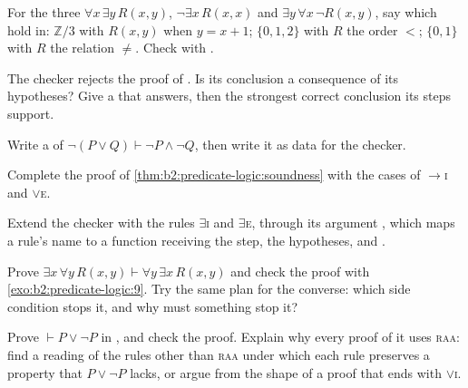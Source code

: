 \begin{exercise}[$\star\star$]\label{exo:b2:predicate-logic:5}
For the three  $\forall x\, \exists y\, R(x, y)$, $\neg \exists x\, R(x, x)$ and $\exists y\, \forall x\, \neg
R(x, y)$, say which hold in: $\mathbb{Z}/3$ with $R(x, y)$ when $y = x + 1$; $\{0, 1, 2\}$ with $R$ the order $<$;
$\{0, 1\}$ with $R$ the relation $\neq$. Check with .
\end{exercise}

\begin{exercise}[$\star\star$]\label{exo:b2:predicate-logic:6}
The checker rejects the proof of . Is its conclusion a consequence of its hypotheses? Give a
 that answers, then the strongest correct conclusion its steps support.
\end{exercise}

\begin{exercise}[$\star\star$]\label{exo:b2:predicate-logic:7}
Write a  of $\neg(P \vee Q) \vdash \neg P \wedge \neg Q$, then write it as data for the checker.
\end{exercise}

\begin{exercise}[$\star\star$]\label{exo:b2:predicate-logic:8}
Complete the proof of \cref{thm:b2:predicate-logic:soundness} with the cases of $\to$\textsc{i} and $\vee$\textsc{e}.
\end{exercise}

\begin{exercise}[$\star\star$]\label{exo:b2:predicate-logic:9}
Extend the checker with the rules $\exists$\textsc{i} and $\exists$\textsc{e}, through its argument , which
maps a rule's name to a function receiving the step, the hypotheses,  and .
\end{exercise}

\begin{exercise}[$\star\star\star$]\label{exo:b2:predicate-logic:10}
Prove $\exists x\, \forall y\, R(x, y) \vdash \forall y\, \exists x\, R(x, y)$ and check the proof with
\cref{exo:b2:predicate-logic:9}. Try the same plan for the converse: which side condition stops it, and why must
something stop it?
\end{exercise}

\begin{exercise}[$\star\star\star$]\label{exo:b2:predicate-logic:11}
Prove $\vdash P \vee \neg P$ in , and check the proof. Explain why every proof of it uses
\textsc{raa}: find a reading of the rules other than \textsc{raa} under which each rule preserves a property that $P \vee
\neg P$ lacks, or argue from the shape of a proof that ends with $\vee$\textsc{i}.
\end{exercise}

